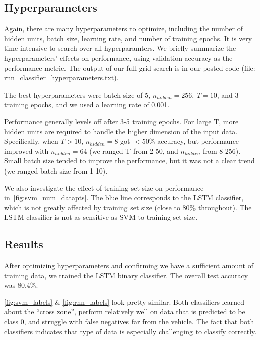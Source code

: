 \subsection{Hyperparameters}
Again, there are many hyperparameters to optimize, including the number of hidden units, batch size, learning rate, and number of training epochs.
It is very time intensive to search over all hyperparamters.
We briefly summarize the hyperparameters' effects on performance, using validation accuracy as the performance metric.
The output of our full grid search is in our posted code (file: rnn\_classifier\_hyperparameters.txt).

The best hyperparameters were batch size of 5, $n_{hidden}=256$, $T=10$, and 3 training epochs, and we used a learning rate of 0.001.

Performance generally levels off after 3-5 training epochs.
For large T, more hidden units are required to handle the higher dimension of the input data.
Specifically, when $T>10$, $n_{hidden}=8$ got $<50\%$ accuracy, but performance improved with $n_{hidden}=64$ (we ranged T from 2-50, and $n_{hidden}$ from 8-256).
Small batch size tended to improve the performance, but it was not a clear trend (we ranged batch size from 1-10).

We also investigate the effect of training set size on performance in~\cref{fig:svm_num_datapts}.
The blue line corresponds to the LSTM classifier, which is not greatly affected by training set size (close to 80\% throughout).
The LSTM classifier is not as sensitive as SVM to training set size. 

\subsection{Results}
After optimizing hyperparameters and confirming we have a sufficient amount of training data, we trained the LSTM binary classifier.
The overall test accuracy was 80.4\%.

\cref{fig:svm_labels} \& \cref{fig:rnn_labels} look pretty similar.
Both classifiers learned about the ``cross zone'', perform relatively well on data that is predicted to be class 0, and struggle with false negatives far from the vehicle.
The fact that both classifiers indicates that type of data is especially challenging to classify correctly.

